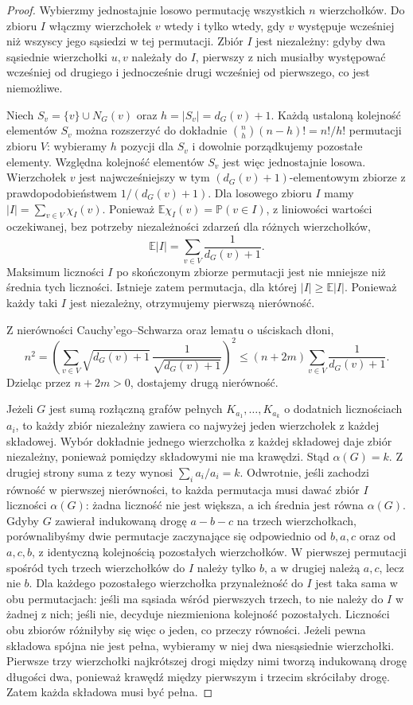\begin{proof}
Wybierzmy jednostajnie losowo
permutację wszystkich $n$ wierzchołków.
Do zbioru $I$ włączmy wierzchołek $v$
wtedy i tylko wtedy, gdy $v$
występuje wcześniej niż wszyscy
jego sąsiedzi w tej permutacji.
Zbiór $I$ jest niezależny:
gdyby dwa sąsiednie wierzchołki
$u,v$ należały do $I$,
pierwszy z nich musiałby
występować wcześniej od
drugiego i jednocześnie
drugi wcześniej od pierwszego,
co jest niemożliwe.

Niech $S_v=\{v\}\cup N_G(v)$ oraz $h=|S_v|=d_G(v)+1$.
Każdą ustaloną kolejność elementów $S_v$
można rozszerzyć do dokładnie
$\binom nh(n-h)!=n!/h!$ permutacji zbioru $V$:
wybieramy $h$ pozycji dla $S_v$ i dowolnie
porządkujemy pozostałe elementy.
Względna kolejność elementów $S_v$ jest więc
jednostajnie losowa.
Wierzchołek $v$ jest
najwcześniejszy w tym
$(d_G(v)+1)$-elementowym
zbiorze z prawdopodobieństwem
$1/(d_G(v)+1)$.
Dla losowego zbioru $I$ mamy
$|I|=\sum_{v\in V}\chi_I(v)$.
Ponieważ $\mathbb E\chi_I(v)=\mathbb P(v\in I)$,
z liniowości wartości oczekiwanej, bez potrzeby
niezależności zdarzeń dla różnych wierzchołków,
\[
\mathbb E|I|
=\sum_{v\in V}\frac{1}{d_G(v)+1}.
\]
Maksimum liczności $I$ po skończonym zbiorze
permutacji jest nie mniejsze niż średnia tych
liczności. Istnieje zatem permutacja, dla której
$|I|\geq\mathbb E|I|$.
Ponieważ każdy taki $I$
jest niezależny, otrzymujemy
pierwszą nierówność.

Z nierówności Cauchy'ego--Schwarza
oraz lematu o uściskach dłoni,
\[
n^2=
\left(\sum_{v\in V}
\sqrt{d_G(v)+1}\,
\frac1{\sqrt{d_G(v)+1}}\right)^2
\leq(n+2m)
\sum_{v\in V}\frac1{d_G(v)+1}.
\]
Dzieląc przez $n+2m>0$,
dostajemy drugą nierówność.

Jeżeli $G$ jest sumą rozłączną
grafów pełnych $K_{a_1},\ldots,K_{a_k}$
o dodatnich licznościach $a_i$,
to każdy zbiór niezależny zawiera
co najwyżej jeden wierzchołek
z każdej składowej. Wybór dokładnie jednego
wierzchołka z każdej składowej daje zbiór
niezależny, ponieważ pomiędzy składowymi
nie ma krawędzi. Stąd $\alpha(G)=k$. Z drugiej strony
suma z tezy wynosi
$\sum_i a_i/a_i=k$.
Odwrotnie, jeśli zachodzi równość w pierwszej
nierówności, to każda permutacja musi dawać zbiór
$I$ liczności $\alpha(G)$: żadna liczność nie jest
większa, a ich średnia jest równa $\alpha(G)$.
Gdyby $G$ zawierał indukowaną drogę $a-b-c$
na trzech wierzchołkach, porównalibyśmy dwie
permutacje zaczynające się odpowiednio od
$b,a,c$ oraz od $a,c,b$, z identyczną kolejnością
pozostałych wierzchołków. W pierwszej permutacji
spośród tych trzech wierzchołków do $I$ należy
tylko $b$, a w drugiej należą $a,c$, lecz nie $b$.
Dla każdego pozostałego wierzchołka przynależność
do $I$ jest taka sama w obu permutacjach:
jeśli ma sąsiada wśród pierwszych trzech, to
nie należy do $I$ w żadnej z nich; jeśli nie,
decyduje niezmieniona kolejność pozostałych.
Liczności obu zbiorów różniłyby się więc o jeden,
co przeczy równości.
Jeżeli pewna składowa spójna nie jest pełna,
wybieramy w niej dwa niesąsiednie wierzchołki.
Pierwsze trzy wierzchołki najkrótszej drogi między nimi
tworzą indukowaną drogę długości dwa, ponieważ
krawędź między pierwszym i trzecim skróciłaby drogę.
Zatem każda składowa musi być pełna.


\end{proof}

